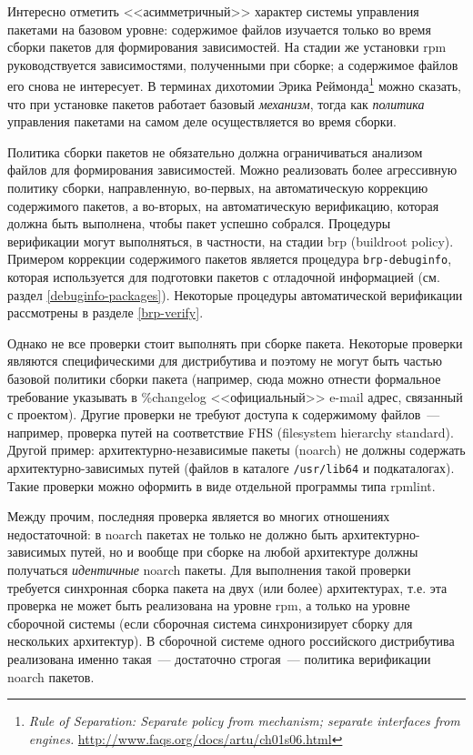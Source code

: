 \documentclass[russian,a4paper,12pt,titlepage]{article}
\begin{document}
Интересно отметить <<асимметричный>> характер системы управления пакетами на базовом уровне: содержимое
файлов изучается только во время сборки пакетов для формирования зависимостей.  На стадии же установки
rpm руководствуется зависимостями, полученными при сборке; а содержимое файлов его снова не интересует.
В терминах дихотомии Эрика Реймонда\footnote{\textit{Rule of Separation: Separate policy from mechanism;
separate interfaces from engines.} \url{http://www.faqs.org/docs/artu/ch01s06.html}}
можно сказать, что при установке пакетов работает базовый \textit{механизм}, тогда как \textit{политика}
управления пакетами на самом деле осуществляется во время сборки.

Политика сборки пакетов не обязательно должна ограничиваться анализом файлов для формирования зависимостей.
Можно реализовать более агрессивную политику сборки, направленную, во-первых, на автоматическую коррекцию содержимого
пакетов, а во-вторых, на автоматическую верификацию, которая должна быть выполнена, чтобы пакет успешно собрался.
Процедуры верификации могут выполняться, в частности, на стадии brp (buildroot policy).  Примером коррекции содержимого
пакетов является процедура \verb|brp-debuginfo|, которая используется для подготовки пакетов с отладочной информацией (см. раздел
\ref{debuginfo-packages}).  Некоторые процедуры автоматической верификации рассмотрены в разделе \ref{brp-verify}.

Однако не все проверки стоит выполнять при сборке пакета.  Некоторые проверки
являются специфическими для дистрибутива и поэтому не могут быть частью базовой
политики сборки пакета (например, сюда можно отнести формальное требование указывать
в \%changelog <<официальный>> e-mail адрес, связанный с проектом).  Другие проверки не требуют
доступа к содержимому файлов~--- например, проверка путей на соответствие FHS (filesystem hierarchy standard).
Другой пример: архитектурно-независимые пакеты (noarch) не должны содержать архитектурно-зависимых путей
(файлов в каталоге \verb|/usr/lib64| и подкаталогах).  Такие проверки можно оформить в виде отдельной программы
типа rpmlint.

Между прочим, последняя проверка является во многих отношениях недостаточной: в noarch пакетах не только не должно быть
архитектурно-зависимых путей, но и вообще при сборке на любой архитектуре должны получаться \emph{идентичные} noarch пакеты.
Для выполнения такой проверки требуется синхронная сборка пакета на двух (или более) архитектурах, т.е. эта проверка
не может быть реализована на уровне rpm, а только на уровне сборочной системы (если сборочная система синхронизирует
сборку для нескольких архитектур).  В сборочной системе одного российского дистрибутива реализована именно такая~--- достаточно
строгая~--- политика верификации noarch пакетов.
\end{document}
